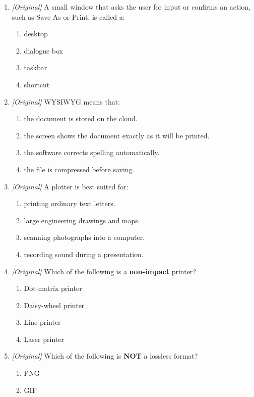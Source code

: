 \documentclass[11pt]{article}
\begin{document}
\begin{enumerate}[label=\textbf{Q\arabic*.}, leftmargin=*]
\begin{enumerate}[label=\Alph*.]
  \end{enumerate}
\item \textit{[Original]} A small window that asks the user for input or
  confirms an action, such as Save As or Print, is called a:
  \begin{enumerate}[label=\Alph*.]
    \item desktop
    \item dialogue box
    \item taskbar
    \item shortcut
  \end{enumerate}
\item \textit{[Original]} WYSIWYG means that:
  \begin{enumerate}[label=\Alph*.]
    \item the document is stored on the cloud.
    \item the screen shows the document exactly as it will be printed.
    \item the software corrects spelling automatically.
    \item the file is compressed before saving.
  \end{enumerate}
\item \textit{[Original]} A plotter is best suited for:
  \begin{enumerate}[label=\Alph*.]
    \item printing ordinary text letters.
    \item large engineering drawings and maps.
    \item scanning photographs into a computer.
    \item recording sound during a presentation.
  \end{enumerate}
\item \textit{[Original]} Which of the following is a \textbf{non-impact}
  printer?
  \begin{enumerate}[label=\Alph*.]
    \item Dot-matrix printer
    \item Daisy-wheel printer
    \item Line printer
    \item Laser printer
  \end{enumerate}
\item \textit{[Original]} Which of the following is \textbf{NOT} a lossless
  format?
  \begin{enumerate}[label=\Alph*.]
    \item PNG
    \item GIF

\end{enumerate}
\end{enumerate}
\end{document}
